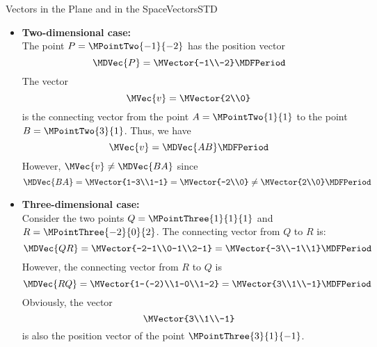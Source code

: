 \begin{MXContent}{Vectors in the Plane and in the Space}{Vectors}{STD}
\begin{MInfo}
\begin{itemize}
\begin{center}
{
}
\end{center}

\end{itemize}
 
\end{MInfo}

\begin{MExample}
\begin{itemize}
 \item \textbf{Two-dimensional case:}\\
 The point $P=\MPointTwo{-1}{-2}$ has the position vector 
 \[
  \MDVec{P} = \MVector{-1\\-2} \MDFPeriod
 \]
 The vector
 \[
  \MVec{v}=\MVector{2\\0}
 \]
 is the connecting vector from the point $A=\MPointTwo{1}{1}$ to the point $B=\MPointTwo{3}{1}$. Thus, we have
 \[
  \MVec{v}=\MDVec{A B} \MDFPeriod 
 \]
 However, $\MVec{v}\neq\MDVec{B A}$ since
 \[
  \MDVec{B A} = \MVector{1-3\\1-1} = \MVector{-2\\0}\neq\MVector{2\\0} \MDFPeriod
 \]
 \item \textbf{Three-dimensional case:}\\
 Consider the two points $Q=\MPointThree{1}{1}{1}$ and $R=\MPointThree{-2}{0}{2}$. The connecting vector from $Q$ to $R$ is:
 \[
  \MDVec{Q R}=\MVector{-2-1\\0-1\\2-1}= \MVector{-3\\-1\\1}\MDFPeriod
 \]
 However, the connecting vector from $R$ to $Q$ is
 \[
  \MDVec{R Q}=\MVector{1-(-2)\\1-0\\1-2}=\MVector{3\\1\\-1} \MDFPeriod
 \]
 Obviously, the vector
 \[
  \MVector{3\\1\\-1}
 \]
 is also the position vector of the point $\MPointThree{3}{1}{-1}$.
\end{itemize}
 

\end{MExample}
\end{MXContent}
